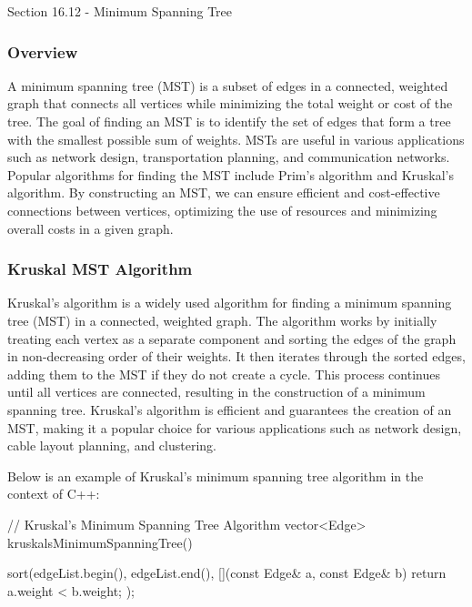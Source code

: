 \begin{notes}{Section 16.12 - Minimum Spanning Tree}
    \subsubsection*{Overview}

    A minimum spanning tree (MST) is a subset of edges in a connected, weighted graph that connects all vertices while minimizing the total weight or cost of the tree. The goal of finding an MST is to identify the set of edges that form 
    a tree with the smallest possible sum of weights. MSTs are useful in various applications such as network design, transportation planning, and communication networks. Popular algorithms for finding the MST include Prim's algorithm and 
    Kruskal's algorithm. By constructing an MST, we can ensure efficient and cost-effective connections between vertices, optimizing the use of resources and minimizing overall costs in a given graph.
    
    \subsubsection*{Kruskal MST Algorithm}
    
    Kruskal's algorithm is a widely used algorithm for finding a minimum spanning tree (MST) in a connected, weighted graph. The algorithm works by initially treating each vertex as a separate component and sorting the edges of the graph 
    in non-decreasing order of their weights. It then iterates through the sorted edges, adding them to the MST if they do not create a cycle. This process continues until all vertices are connected, resulting in the construction of a minimum 
    spanning tree. Kruskal's algorithm is efficient and guarantees the creation of an MST, making it a popular choice for various applications such as network design, cable layout planning, and clustering.
    
    \begin{highlight}
        Below is an example of Kruskal's minimum spanning tree algorithm in the context of C++:
    
    \begin{code}[C++]
    // Kruskal's Minimum Spanning Tree Algorithm
    vector<Edge> kruskalsMinimumSpanningTree() {
        sort(edgeList.begin(), edgeList.end(), [](const Edge& a, const Edge& b) {
            return a.weight < b.weight;
        });
    
}
\end{code}
\end{highlight}
\end{notes}
